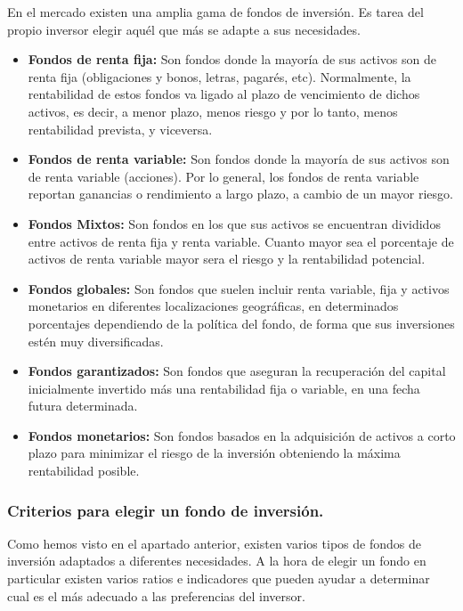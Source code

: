 \documentclass[12pt, a4paper]{article}
\begin{document}
En el mercado existen una amplia gama de fondos de inversión. Es tarea del propio inversor elegir aquél que más se adapte a sus necesidades.

\begin{itemize}
	\item \textbf{Fondos de renta fija:} Son fondos donde la mayoría de sus activos son de renta fija (obligaciones y bonos, letras, pagarés, etc). Normalmente, la rentabilidad de estos fondos va ligado al plazo de vencimiento de dichos activos, es decir, a menor plazo, menos riesgo y por lo tanto, menos rentabilidad prevista, y viceversa.
	\item \textbf{Fondos de renta variable:} Son fondos donde la mayoría de sus activos son de renta variable (acciones). Por lo general, los fondos de renta variable reportan ganancias o rendimiento a largo plazo, a cambio de un mayor riesgo.
	\item \textbf{Fondos Mixtos:} Son fondos en los que sus activos se encuentran divididos entre activos de renta fija y renta variable. Cuanto mayor sea el porcentaje de activos de renta variable mayor sera el riesgo y la rentabilidad potencial.
	\item \textbf{Fondos globales:} Son fondos que suelen incluir renta variable, fija y activos monetarios en diferentes localizaciones geográficas, en determinados porcentajes dependiendo de la política del fondo, de forma que sus inversiones estén muy diversificadas.
	\item \textbf{Fondos garantizados:} Son fondos que aseguran la recuperación del capital inicialmente invertido más una rentabilidad fija o variable, en una fecha futura determinada.
	\item \textbf{Fondos monetarios:} Son fondos basados en la adquisición de activos a corto plazo para minimizar el riesgo de la inversión obteniendo la máxima rentabilidad posible.
\end{itemize}


\subsubsection{Criterios para elegir un fondo de inversión.}


Como hemos visto en el apartado anterior, existen varios tipos de fondos de inversión adaptados a diferentes necesidades. A la hora de elegir un fondo en particular existen varios ratios e indicadores que pueden ayudar a determinar cual es el más adecuado a las preferencias del inversor.\\
\end{document}
